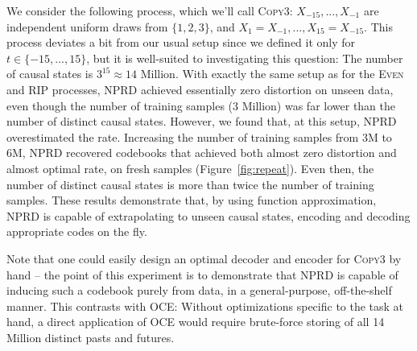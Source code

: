 \documentclass[11pt,letterpaper]{article}
\begin{document}
We consider the following process, which we'll call \textsc{Copy3}: $X_{-15}, ..., X_{-1}$ are independent uniform draws from $\{1,2,3\}$, and $X_1 = X_{-1}, ..., X_{15} = X_{-15}$.
This process deviates a bit from our usual setup since we defined it only for $t \in \{-15, ..., 15\}$, but it is well-suited to investigating this question:
The number of causal states is $3^{15} \approx 14$ Million.
With exactly the same setup as for the \textsc{Even} and \textsc{RIP} processes, NPRD achieved essentially zero distortion on unseen data, even though the number of training samples (3 Million) was far lower than the number of distinct causal states.
However, we found that, at this setup, NPRD overestimated the rate.
Increasing the number of training samples from 3M to 6M, NPRD recovered codebooks that achieved both almost zero distortion and almost optimal rate, on fresh samples (Figure~\ref{fig:repeat}).
Even then, the number of distinct causal states is more than twice the number of training samples.
These results demonstrate that, by using function approximation, NPRD is capable of extrapolating to unseen causal states, encoding and decoding appropriate codes on the fly.


Note that one could easily design an optimal decoder and encoder for \textsc{Copy3} by hand -- the point of this experiment is to demonstrate that NPRD is capable of inducing such a codebook purely from data, in a general-purpose, off-the-shelf manner.
This contrasts with OCE:
Without optimizations specific to the task at hand, a direct application of OCE would require brute-force storing of all 14 Million distinct pasts and futures.


%
%
%
%
%
\end{document}
